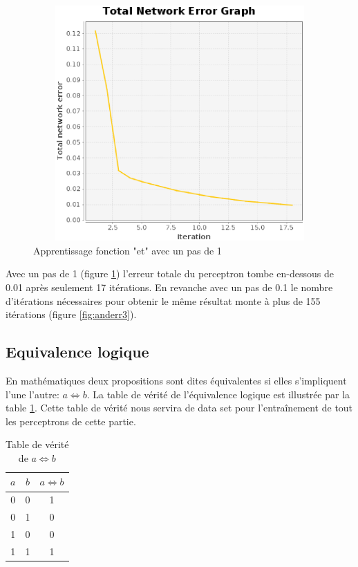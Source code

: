 \documentclass[twoside,openright,a4paper,11pt,french]{article}
\begin{document}
\begin{figure}[ht]
\centering
\includegraphics[width=12cm,height=9cm]{./pics/and_error4.eps}
\caption{Apprentissage fonction "et" avec un pas de 1}
\label{fig:anderr4}
\end{figure}

Avec un pas de 1 (figure \ref{fig:anderr4}) l'erreur totale du perceptron
tombe en-dessous de 0.01 après seulement 17 itérations. En revanche avec 
un pas de 0.1 le nombre d'itérations nécessaires pour obtenir le même
résultat monte à plus de 155 itérations (figure \ref{fig:anderr3}).

\clearpage
\subsection{Equivalence logique}
En mathématiques deux propositions sont dites équivalentes si elles s'impliquent
l'une l'autre: $a \Leftrightarrow b$. La table de vérité de l'équivalence
logique est illustrée par la table \ref{tab:eq}.
Cette table de vérité nous servira de data set pour l'entraînement de tout
les perceptrons de cette partie.


\begin{table}[ht]
  \centering
  \begin{tabular}{| c | c | c |}
    \hline
    \textbf{$a$} & \textbf{$b$} & \textbf{$a \Leftrightarrow b$}\\
    \hline
    0 & 0  & 1 \\
    \hline
    0 & 1  & 0 \\
    \hline
    1 & 0  & 0 \\
    \hline
    1 & 1  & 1 \\
    \hline
  \end{tabular}
  \caption{Table de vérité de $a \Leftrightarrow b$}
  \label{tab:eq}
\end{table}
\end{document}
